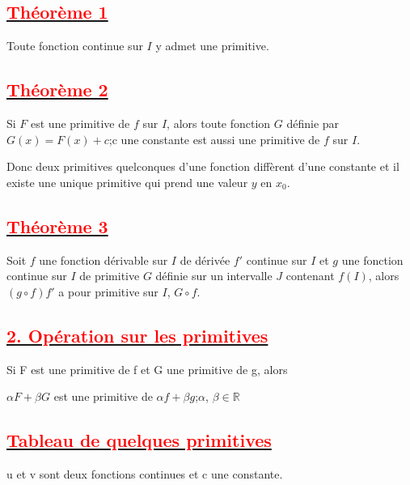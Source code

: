 \documentclass[12pt]{article}
\begin{document}
\subsection*{\underline{\textbf{\textcolor{red}{Théorème 1}}}}
Toute fonction continue sur $I$ y admet une primitive.
\subsection*{\underline{\textbf{\textcolor{red}{Théorème 2}}}}
Si $F$ est une primitive de $f$ sur $I$, alors toute fonction $G$ définie par
$G(x)=F(x)+c$;c une constante est aussi une primitive de $f$ sur $I$.
 
Donc deux primitives quelconques d'une fonction diffèrent d'une constante et il existe une unique primitive qui prend une valeur $y$ en $x_{0}$.
\subsection*{\underline{\textbf{\textcolor{red}{Théorème 3}}}}

Soit $f$ une fonction dérivable sur $I$ de dérivée $f'$ continue sur $I$ et $g$ une fonction continue sur $I$ de primitive $G$ définie sur un intervalle $J$ contenant $f(I)$, alors $(g\circ f)f'$ a pour primitive sur $I$, $G\circ f$.
\subsection*{\underline{\textbf{\textcolor{red}{2. Opération sur les primitives}}}}
Si F est une primitive de f et G une primitive de g, alors 

$\alpha F+\beta G$ est une primitive de $\alpha f+\beta g$;$\alpha $, $\beta \in \mathbb{R}$
\subsection*{\underline{\textbf{\textcolor{red}{Tableau de quelques primitives}}}}
u et v sont deux fonctions continues et c une constante.
\end{document}
